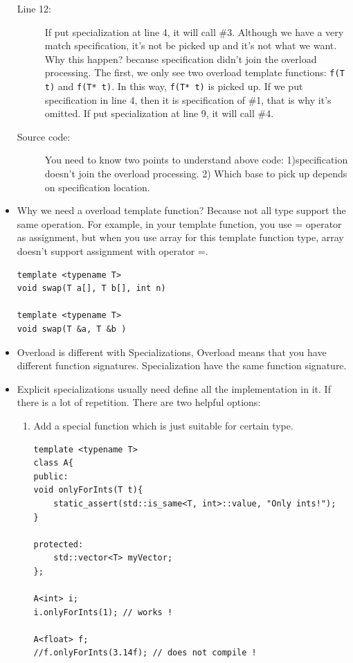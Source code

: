 \documentclass[a4paper,11pt,twoside]{book}
\begin{document}
\begin{itemize}
\begin{description}
	\item[Line 12:] If put specialization at line 4, it will call \#3. Although we have a very match specification, it's not be picked up and it's not what we want.  Why this happen? because specification didn't join the overload processing. The first, we only see two overload template functions: \texttt{f(T t)} and \texttt{f(T* t)}. In this way, \texttt{f(T* t)} is picked up. If we put specification in line 4, then it is specification of \#1, that is why it's omitted. If put specialization at line 9, it will call \#4.
	
	\item[Source code:] You need to know two points to understand above code: 1)specification doesn't join the overload processing. 2) Which base to pick up depends on specification location.
\end{description}

	\item Why we need a overload template function? Because not all type support the same operation. For example, in your template function, you use = operator as assignment, but when you use array for this template function type, array doesn't support assignment with operator =.
\begin{lstlisting}[numbers=none]
template <typename T>
void swap(T a[], T b[], int n)

template <typename T>
void swap(T &a, T &b )
\end{lstlisting}

	\item Overload is different with Specializations, Overload means that you have different function signatures. Specialization have the same function signature.

	\item Explicit specializations usually need define all the implementation in it. If there is a lot of repetition. There are two helpful options: 
\begin{enumerate}
	\item Add a special function which is just suitable for certain type. 
\begin{lstlisting}[numbers=none]
template <typename T>
class A{
public:
void onlyForInts(T t){
	static_assert(std::is_same<T, int>::value, "Only ints!");
}

protected:
	std::vector<T> myVector;
};

A<int> i;
i.onlyForInts(1); // works !

A<float> f;
//f.onlyForInts(3.14f); // does not compile !
\end{lstlisting}


\end{enumerate}
\end{itemize}
\end{document}
